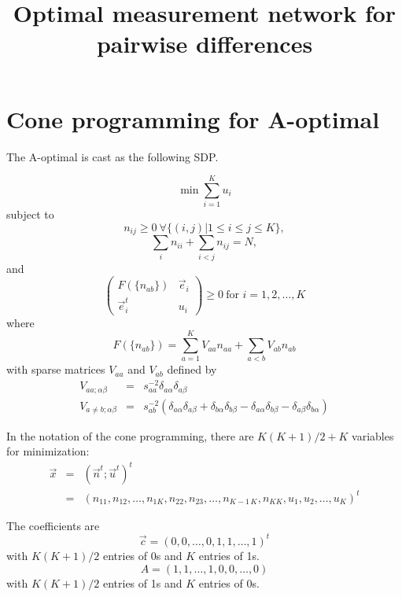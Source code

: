 \documentclass{article}
\begin{document}
\title{Optimal measurement network for pairwise differences}

\section{Cone programming for A-optimal}

The A-optimal is cast as the following SDP.

\begin{equation}
\min \sum_{i=1}^K u_i
\end{equation}
subject to
\begin{equation}
n_{ij} \geq 0  \ \forall \{ (i,j)|1 \leq i \leq j \leq K\},
\end{equation}
\begin{equation}
\sum_i n_{ii} + \sum_{i<j} n_{ij} = N,
\end{equation}
and
\begin{equation}
  \left(
\begin{array}{cc}
 F(\{n_{ab}\}) & \vec{e}_i \\
 \vec{e}_i^t & u_i
\end{array} \right) \geq 0  \ \text{for } i=1,2, \dots, K
\end{equation}
where
\begin{equation}
F( \{n_{ab}\} ) = \sum_{a=1}^K V_{aa} n_{aa}
   + \sum_{a<b} V_{ab} n_{ab} 
\end{equation}
with sparse matrices $V_{aa}$ and $V_{ab}$ defined by
\begin{eqnarray}
V_{aa;\alpha\beta} &=& s_{aa}^{-2} \delta_{a\alpha}\delta_{a\beta}
\nonumber \\
V_{a\neq b;\alpha\beta} &=& s_{ab}^{-2} (\delta_{a\alpha}\delta_{a\beta} + \delta_{b\alpha}\delta_{b\beta} - \delta_{a\alpha}\delta_{b\beta} - \delta_{a\beta}\delta_{b\alpha}) 
\end{eqnarray}

In the notation of the cone programming, there are $K(K+1)/2 + K$ variables for 
minimization:
\begin{eqnarray}
  \vec{x} &=& ( \vec{n}^t; \vec{u}^t )^t
  \nonumber \\
    &=& ( n_{11}, n_{12}, \dots, n_{1K}, n_{22}, n_{23}, \dots, n_{K-1\, K}, n_{KK},
          u_1, u_2, \dots, u_K )^t
\end{eqnarray}

The coefficients are
\begin{equation}
\vec{c} = (0, 0, \dots, 0, 1, 1, \dots, 1 )^t
\end{equation}
with $K(K+1)/2$ entries of 0s and $K$ entries of 1s.
\begin{equation}
A = \left( 1, 1, \dots, 1, 0, 0, \dots, 0 \right)
\end{equation}
with $K(K+1)/2$ entries of 1s and $K$ entries of 0s.
\end{document}
